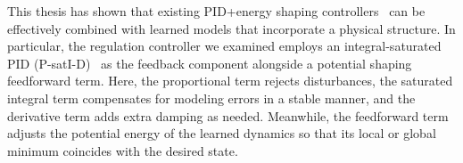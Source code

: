 This thesis has shown that existing PID+energy shaping controllers~\citep{kelly1995tuning, kelly1996class, kelly1998global, sciavicco2012modelling, della2023model} can be effectively combined with learned models that incorporate a physical structure. In particular, the regulation controller we examined employs an integral-saturated PID (P-satI-D)~\citep{pustina2022p} as the feedback component alongside a potential shaping feedforward term. Here, the proportional term rejects disturbances, the saturated integral term compensates for modeling errors in a stable manner, and the derivative term adds extra damping as needed. Meanwhile, the feedforward term adjusts the potential energy of the learned dynamics so that its local or global minimum coincides with the desired state.

